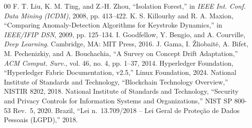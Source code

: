 \documentclass[conference]{IEEEtran}
\begin{document}
\begin{thebibliography}{00}
 F. T. Liu, K. M. Ting, and Z.-H. Zhou, ``Isolation Forest,'' in \emph{IEEE Int. Conf. Data Mining (ICDM)}, 2008, pp. 413--422.
 K. S. Killourhy and R. A. Maxion, ``Comparing Anomaly-Detection Algorithms for Keystroke Dynamics,'' in \emph{IEEE/IFIP DSN}, 2009, pp. 125--134.
 I. Goodfellow, Y. Bengio, and A. Courville, \emph{Deep Learning}. Cambridge, MA: MIT Press, 2016.
 J. Gama, I. \v{Z}liobait\.e, A. Bifet, M. Pechenizkiy, and A. Bouchachia, ``A Survey on Concept Drift Adaptation,'' \emph{ACM Comput. Surv.}, vol. 46, no. 4, pp. 1--37, 2014.
 Hyperledger Foundation, ``Hyperledger Fabric Documentation, v2.5,'' Linux Foundation, 2024.
 National Institute of Standards and Technology, ``Blockchain Technology Overview,'' NISTIR 8202, 2018.
 National Institute of Standards and Technology, ``Security and Privacy Controls for Information Systems and Organizations,'' NIST SP 800-53 Rev.\ 5, 2020.
 Brazil, ``Lei n.\ 13.709/2018 -- Lei Geral de Prote\c{c}\~ao de Dados Pessoais (LGPD),'' 2018.
\end{thebibliography}
\end{document}
